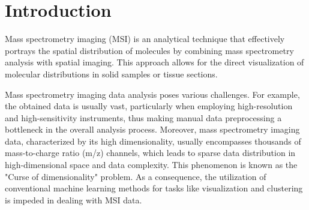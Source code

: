 \documentclass{WileyMSP-template}
\begin{document}
\section{Introduction}
Mass spectrometry imaging (MSI) is an analytical technique that effectively 
portrays the spatial distribution of molecules by combining mass spectrometry 
analysis with spatial imaging. This approach allows for the direct 
visualization of molecular distributions in solid samples or tissue sections. 
  




Mass spectrometry imaging data analysis poses various challenges. 
For example, the obtained data is usually vast, 
particularly when employing high-resolution and high-sensitivity instruments, 
thus making manual data preprocessing a bottleneck 
in the overall analysis process. 
Moreover, mass spectrometry imaging data, 
characterized by its high dimensionality, 
usually encompasses thousands of mass-to-charge ratio (m/z) channels, 
which leads to sparse data distribution in high-dimensional space and data complexity. 
This phenomenon is known as the "Curse of dimensionality" problem.  
As a consequence, 
the utilization of conventional machine learning methods for 
tasks like visualization and clustering 
is impeded in dealing with MSI data. 
\end{document}
